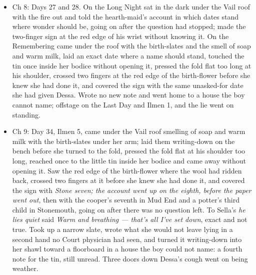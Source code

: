 \documentclass{design/chronicle}
\begin{document}
{\begin{itemize}[leftmargin=1.4em,itemsep=1pt,topsep=3pt,parsep=0pt]

\item Ch 8: Days 27 and 28. On the Long Night sat in the dark under the Vail roof with the fire out and told the hearth-maid’s account in which dates stand where wonder should be, going on after the question had stopped; made the two-finger sign at the red edge of his wrist without knowing it. On the Remembering came under the roof with the birth-slates and the smell of soap and warm milk, laid an exact date where a name should stand, touched the tin once inside her bodice without opening it, pressed the fold flat too long at his shoulder, crossed two fingers at the red edge of the birth-flower before she knew she had done it, and covered the sign with the same unasked-for date she had given Dessa. Wrote no new note and went home to a house the boy cannot name; offstage on the Last Day and Ilmen 1, and the lie went on standing.

\end{itemize}

\begin{itemize}[leftmargin=1.4em,itemsep=1pt,topsep=3pt,parsep=0pt]

\item Ch 9: Day 34, Ilmen 5, came under the Vail roof smelling of soap and warm milk with the birth-slates under her arm; laid them writing-down on the bench before she turned to the fold, pressed the fold flat at his shoulder too long, reached once to the little tin inside her bodice and came away without opening it. Saw the red edge of the birth-flower where the wool had ridden back, crossed two fingers at it before she knew she had done it, and covered the sign with \emph{Stone seven; the account went up on the eighth, before the paper went out}, then with the cooper’s seventh in Mud End and a potter’s third child in Stonemouth, going on after there was no question left. To Sella’s \emph{he lies quiet} said \emph{Warm and breathing --- that’s all I’ve set down}, exact and not true. Took up a narrow slate, wrote what she would not leave lying in a second hand no Court physician had seen, and turned it writing-down into her shawl toward a floorboard in a house the boy could not name: a fourth note for the tin, still unread. Three doors down Dessa’s cough went on being weather.

\end{itemize}

\begin{itemize}[leftmargin=1.4em,itemsep=1pt,topsep=3pt,parsep=0pt]


\end{itemize}}
\end{document}
